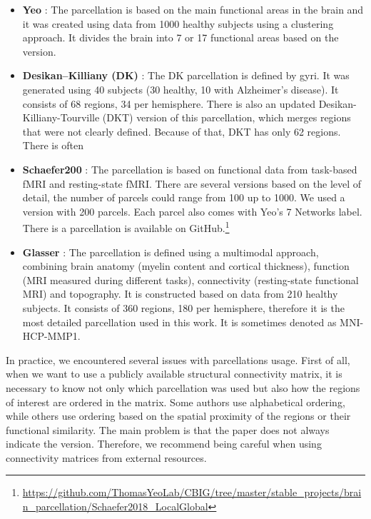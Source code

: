 \begin{itemize}

    \item \textbf{Yeo}\label{parc:Yeo} \cite{thomas_yeo_organization_2011}: The parcellation is based on the main functional areas in the brain and it was created using data from 1000 healthy subjects using a clustering approach. It divides the brain into 7 or 17 functional areas based on the version.
    
    \item \textbf{Desikan–Killiany (DK)}\label{parc:DK}  \cite{desikan_automated_2006}: The DK parcellation is defined by gyri. It was generated using 40 subjects (30 healthy, 10 with Alzheimer’s disease). It consists of 68 regions, 34 per hemisphere. There is also an updated Desikan-Killiany-Tourville (DKT) \cite{klein_101_2012} version of this parcellation, which merges regions that were not clearly defined. Because of that, DKT has only 62 regions. There is often 
    
    \item \textbf{Schaefer200}\label{parc:Schaefer200}  \cite{schaefer_local-global_2018}: The parcellation is based on functional data from task-based fMRI and resting-state fMRI. There are several versions based on the level of detail, the number of parcels could range from 100 up to 1000. We used a version with 200 parcels. Each parcel also comes with Yeo's 7 Networks label.
    There is a parcellation is available on GitHub.\footnote{\url{https://github.com/ThomasYeoLab/CBIG/tree/master/stable_projects/brain_parcellation/Schaefer2018_LocalGlobal}}
    
    \item \textbf{Glasser}\label{parc:Glasser}  \cite{glasser_multi-modal_2016}: The parcellation is defined using a multimodal approach, combining brain anatomy (myelin content and cortical thickness), function (MRI measured during different tasks), connectivity (resting-state functional MRI) and topography. It is constructed based on data from 210 healthy subjects. It consists of 360 regions, 180 per hemisphere, therefore it is the most detailed parcellation used in this work. It is sometimes denoted as MNI-HCP-MMP1.
    
\end{itemize}

In practice, we encountered several issues with parcellations usage. First of all, when we want to use a publicly available structural connectivity matrix, it is necessary to know not only which parcellation was used but also how the regions of interest are ordered in the matrix. Some authors use alphabetical ordering, while others use ordering based on the spatial proximity of the regions or their functional similarity. The main problem is that the paper does not always indicate the version. Therefore, we recommend being careful when using connectivity matrices from external resources.

